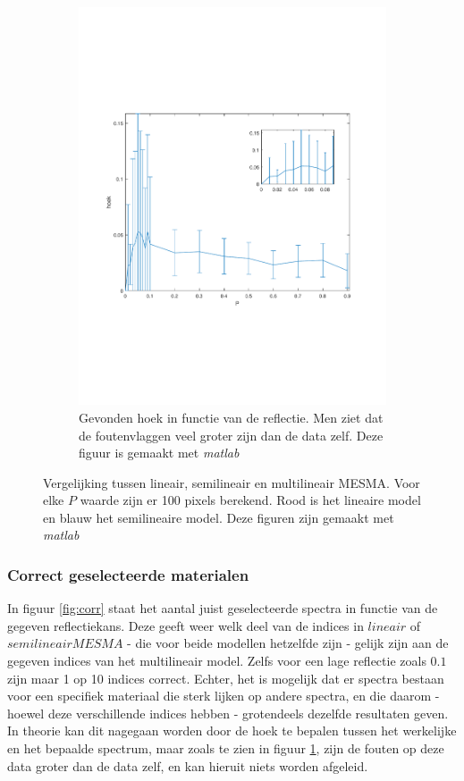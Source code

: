 \documentclass[12pt]{report}
\begin{document}
\begin{figure}
\begin{subfigure}[b]{0.5\textwidth}
\includegraphics[width=\textwidth,trim=0 200 0 175 cm]{PMC_10_100_angle.pdf}
\caption{Gevonden hoek in functie van de reflectie. Men ziet dat de foutenvlaggen veel groter zijn dan de data zelf. Deze figuur is gemaakt met \textit{matlab}\cite{matlab} \label{fig:hoek}}
\end{subfigure}
\caption{Vergelijking tussen lineair, semilineair en multilineair MESMA. Voor elke $P$ waarde zijn er 100 pixels berekend. Rood is het lineaire model en blauw het semilineaire model. Deze figuren zijn gemaakt met \textit{matlab}\cite{matlab}\label{fig:b100}}
\end{figure}

\subsubsection{Correct geselecteerde materialen}

In figuur \ref{fig:corr} staat het aantal juist geselecteerde spectra in functie van de gegeven reflectiekans. Deze geeft weer welk deel van de indices in $lineair$ of $semilineair MESMA$ - die voor beide modellen hetzelfde zijn - gelijk zijn aan de gegeven indices van het multilineair model. Zelfs voor een lage reflectie zoals $0.1$ zijn maar 1 op 10 indices correct. Echter, het is mogelijk dat er spectra bestaan voor een specifiek materiaal die sterk lijken op andere spectra, en die daarom - hoewel deze verschillende indices hebben - grotendeels dezelfde resultaten geven. In theorie kan dit nagegaan worden door de hoek te bepalen tussen het werkelijke en het bepaalde spectrum, maar zoals te zien in figuur \ref{fig:hoek}, zijn de fouten op deze data groter dan de data zelf, en kan hieruit niets worden afgeleid. 
\end{document}
